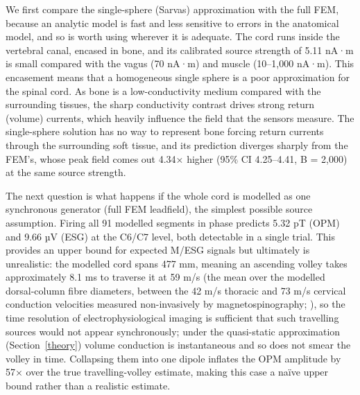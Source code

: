 \documentclass[11pt]{article}
\newcommand{\revised}[1]{#1}
\begin{document}
We first compare the single-sphere (Sarvas) approximation with the full
FEM, because an analytic model is fast and less sensitive to errors in
the anatomical model, and so is worth using wherever it is adequate. The
cord runs inside the vertebral canal, encased in bone, and its
calibrated source strength of 5.11 nA·m is small compared with the vagus
(70 nA·m) and muscle (10--1,000 nA·m). This encasement means that a
homogeneous single sphere is a poor approximation for the spinal cord.
As bone is a low-conductivity medium compared with the surrounding
tissues, the sharp conductivity contrast drives strong return (volume)
currents, which heavily influence the field that the sensors measure.
The single-sphere solution has no way to represent bone forcing return
currents through the surrounding soft tissue, and its prediction
diverges sharply from the FEM's, whose peak field comes
out \revised{4.34× higher (95\% CI 4.25--4.41, B = 2,000)} at the same source strength.

The next question is what happens if the whole cord is modelled as one
synchronous generator (full FEM leadfield), the simplest
possible source assumption. Firing all 91 modelled segments in phase
predicts \revised{5.32 pT (OPM) and 9.66 µV (ESG) at the C6/C7 level}, both detectable in a
single trial. This provides an upper bound for expected M/ESG signals
but ultimately is unrealistic: the modelled cord spans \revised{477 mm}, meaning
an ascending volley takes approximately 8.1 ms to traverse it at 59 m/s
(the mean over the modelled dorsal-column fibre diameters, between the
42 m/s thoracic and 73 m/s cervical conduction velocities measured
non-invasively by magnetospinography; \citealp{Hashimoto2021, Miyano2020}),
so the
time resolution of electrophysiological imaging is sufficient that such
travelling sources would not appear synchronously; under the
quasi-static approximation (Section~\ref{theory}) volume conduction is
instantaneous and so does not smear the volley in time. Collapsing them into
one dipole inflates the OPM amplitude by \revised{57×} over the true
travelling-volley estimate, making this case a naïve upper bound rather
than a realistic estimate.
\end{document}
